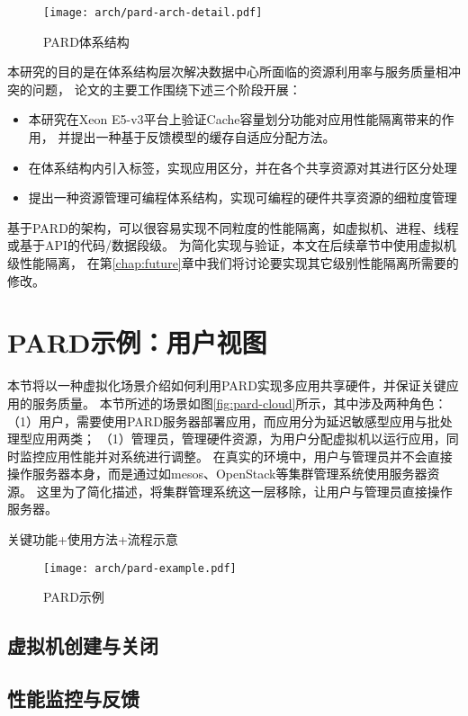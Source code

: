 \begin{figure}[htb]
  \centering
  \texttt{[image: arch/pard-arch-detail.pdf]}
  \caption{PARD体系结构}
  \label{fig:pard-example}
\end{figure}

本研究的目的是在体系结构层次解决数据中心所面临的资源利用率与服务质量相冲突的问题，
论文的主要工作围绕下述三个阶段开展：

\begin{itemize}
 \item 本研究在Xeon E5-v3平台上验证Cache容量划分功能对应用性能隔离带来的作用，
       并提出一种基于反馈模型的缓存自适应分配方法。
 \item 在体系结构内引入标签，实现应用区分，并在各个共享资源对其进行区分处理
 \item 提出一种资源管理可编程体系结构，实现可编程的硬件共享资源的细粒度管理
\end{itemize}

基于PARD的架构，可以很容易实现不同粒度的性能隔离，如虚拟机、进程、线程或基于API的代码/数据段级。
为简化实现与验证，本文在后续章节中使用虚拟机级性能隔离，
在第\ref{chap:future}章中我们将讨论要实现其它级别性能隔离所需要的修改。


\section{PARD示例：用户视图}

本节将以一种虚拟化场景介绍如何利用PARD实现多应用共享硬件，并保证关键应用的服务质量。
本节所述的场景如图\ref{fig:pard-cloud}所示，其中涉及两种角色：
（1）用户，需要使用PARD服务器部署应用，而应用分为延迟敏感型应用与批处理型应用两类；
（1）管理员，管理硬件资源，为用户分配虚拟机以运行应用，同时监控应用性能并对系统进行调整。
在真实的环境中，用户与管理员并不会直接操作服务器本身，而是通过如mesos、OpenStack等集群管理系统使用服务器资源。
这里为了简化描述，将集群管理系统这一层移除，让用户与管理员直接操作服务器。

关键功能+使用方法+流程示意

\begin{figure}[htb]
  \centering
  \texttt{[image: arch/pard-example.pdf]}
  \caption{PARD示例}
  \label{fig:pard-example}
\end{figure}

\subsection{虚拟机创建与关闭}

\subsection{性能监控与反馈}

